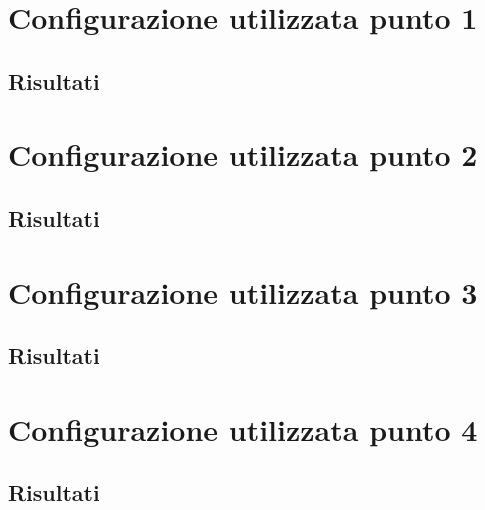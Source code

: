 \documentclass{article}
\begin{document}


    \section{Configurazione utilizzata punto 1}
    
    

    \subsection{Risultati}
    
    
    

    \section{Configurazione utilizzata punto 2}

    

    \subsection{Risultati}

    


    \section{Configurazione utilizzata punto 3}

    

    \subsection{Risultati}

    


    \section{Configurazione utilizzata punto 4}

    

    \subsection{Risultati}

    


    
\end{document}

